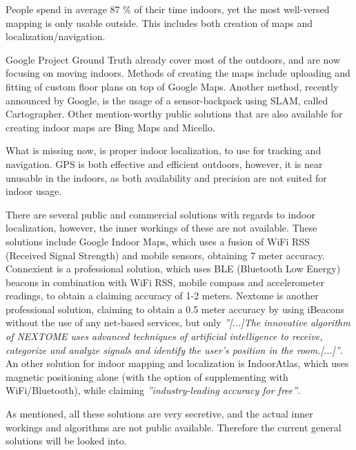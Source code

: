 
People spend in average 87 \% of their time indoors\cite{time_spend_indoor}, yet the most well-versed mapping is only usable outside.
This includes both creation of maps and localization/navigation.

Google Project Ground Truth\cite{googleio_ground_truth} already cover most of the outdoors, and are now focusing on moving indoors\cite{googleio_indoor_maps}\cite{indoor_maps_google_slides}.
Methods of creating the maps include uploading and fitting of custom floor plans on top of Google Maps.
Another method, recently announced by Google, is the usage of a sensor-backpack using SLAM, called Cartographer\cite{cartographer}.
Other mention-worthy public solutions that are also available for creating indoor maps are Bing Maps\cite{bingmaps} and Micello\cite{micello}.

What is missing now, is proper indoor localization, to use for tracking and navigation.
GPS\cite{gps} is both effective and efficient outdoors, however, it is near unusable in the indoors, as both availability and precision are not suited for indoor usage.

There are several public and commercial solutions with regards to indoor localization, however, the inner workings of these are not available.
These solutions include Google Indoor Maps, which uses a fusion of WiFi RSS (Received Signal Strength) and mobile sensors, obtaining 7 meter accuracy\cite{googleio_indoor_maps}.
Connexient is a professional solution, which uses BLE (Bluetooth Low Energy) beacons in combination with WiFi RSS, mobile compass and accelerometer readings, to obtain a claiming accuracy of 1-2 meters\cite{connexient_indoor_pos}.
Nextome is another professional solution, claiming to obtain a 0.5 meter accuracy by using iBeacons\cite{ibeacon} without the use of any net-based services, but only \textit{''[...]The innovative algorithm of NEXTOME uses advanced techniques of artificial intelligence to receive, categorize and analyze signals and identify the user’s position in the room.[...]''}\cite{nextome_indoor_pos}.
An other solution for indoor  mapping and localization is IndoorAtlas, which uses magnetic positioning alone (with the option of supplementing with WiFi/Bluetooth), while claiming \textit{''industry-leading accuracy for free''}\cite{indooratlas_features}.

As mentioned, all these solutions are very secretive, and the actual inner workings and algorithms are not public available.
Therefore the current general solutions will be looked into.